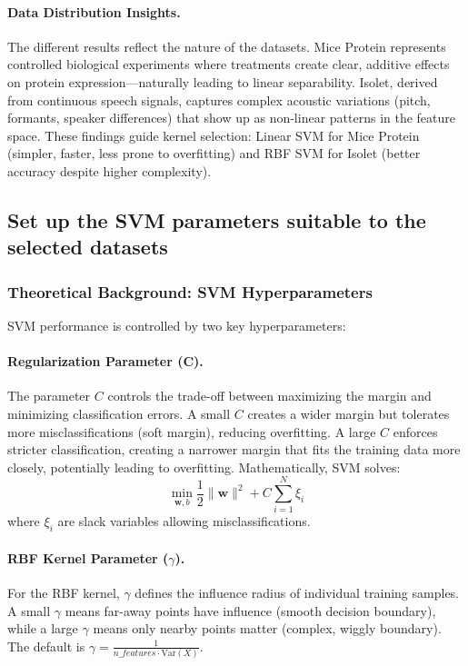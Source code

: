 \documentclass[12pt]{article}
\begin{document}
\paragraph{Data Distribution Insights.} The different results reflect the nature of the datasets. Mice Protein represents controlled biological experiments where treatments create clear, additive effects on protein expression—naturally leading to linear separability. Isolet, derived from continuous speech signals, captures complex acoustic variations (pitch, formants, speaker differences) that show up as non-linear patterns in the feature space. These findings guide kernel selection: Linear SVM for Mice Protein (simpler, faster, less prone to overfitting) and RBF SVM for Isolet (better accuracy despite higher complexity).

\subsection{Set up the SVM parameters suitable to the selected datasets}

\subsubsection{Theoretical Background: SVM Hyperparameters}
SVM performance is controlled by two key hyperparameters:

\paragraph{Regularization Parameter (C).} The parameter $C$ controls the trade-off between maximizing the margin and minimizing classification errors. A small $C$ creates a wider margin but tolerates more misclassifications (soft margin), reducing overfitting. A large $C$ enforces stricter classification, creating a narrower margin that fits the training data more closely, potentially leading to overfitting. Mathematically, SVM solves:
\begin{equation}
    \min_{\mathbf{w}, b} \frac{1}{2}\|\mathbf{w}\|^2 + C \sum_{i=1}^{N} \xi_i
\end{equation}
where $\xi_i$ are slack variables allowing misclassifications.

\paragraph{RBF Kernel Parameter ($\gamma$).} For the RBF kernel, $\gamma$ defines the influence radius of individual training samples. A small $\gamma$ means far-away points have influence (smooth decision boundary), while a large $\gamma$ means only nearby points matter (complex, wiggly boundary). The default is $\gamma = \frac{1}{n\_features \cdot \text{Var}(X)}$.
\end{document}
